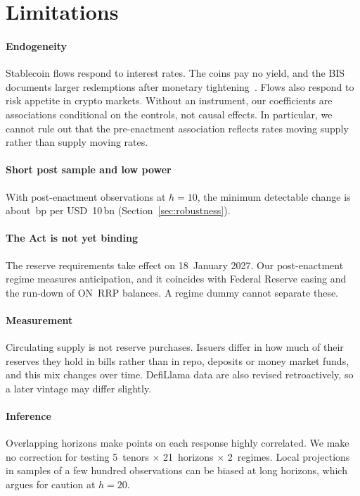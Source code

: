 \section{Limitations}\label{sec:limits}

\paragraph*{Endogeneity} Stablecoin flows respond to interest rates. The coins pay no yield, and the BIS documents larger redemptions after monetary tightening~\cite{bis2025aer}. Flows also respond to risk appetite in crypto markets. Without an instrument, our coefficients are associations conditional on the controls, not causal effects. In particular, we cannot rule out that the pre-enactment association reflects rates moving supply rather than supply moving rates.

\paragraph*{Short post sample and low power} With \nPostTen{} post-enactment observations at $h=10$, the minimum detectable change is about \mde{}\,bp per USD~10\,bn (Section~\ref{sec:robustness}).

\paragraph*{The Act is not yet binding} The reserve requirements take effect on 18~January 2027. Our post-enactment regime measures anticipation, and it coincides with Federal Reserve easing and the run-down of ON~RRP balances. A regime dummy cannot separate these.

\paragraph*{Measurement} Circulating supply is not reserve purchases. Issuers differ in how much of their reserves they hold in bills rather than in repo, deposits or money market funds, and this mix changes over time. DefiLlama data are also revised retroactively, so a later vintage may differ slightly.

\paragraph*{Inference} Overlapping horizons make points on each response highly correlated. We make no correction for testing 5~tenors $\times$ 21~horizons $\times$ 2~regimes. Local projections in samples of a few hundred observations can be biased at long horizons, which argues for caution at $h=20$.
